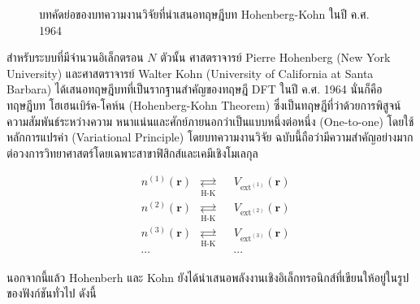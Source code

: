 \begin{figure}[H]
    \centering
    \caption{บทคัดย่อของบทความงานวิจัยที่นำเสนอทฤษฎีบท Hohenberg-Kohn ในปี ค.ศ. 1964}
    \label{fig:hohenberg_kohn_abs}
\end{figure}

สำหรับระบบที่มีจำนวนอิเล็กตรอน $N$ ตัวนั้น ศาสตราจารย์ Pierre Hohenberg (New York University) และศาสตราจารย์ Walter Kohn
(University of California at Santa Barbara) ได้เสนอทฤษฎีบทที่เป็นรากฐานสำคัญของทฤษฎี DFT ในปี ค.ศ. 1964 นั่นก็คือทฤษฎีบท%
โฮเฮนเบิร์ค-โคห์น (Hohenberg-Kohn Theorem)\autocite{hohenberg1964} ซึ่งเป็นทฤษฎีที่ว่าด้วยการพิสูจน์ความสัมพันธ์ระหว่างความ%
หนาแน่นและศักย์ภายนอกว่าเป็นแบบหนึ่งต่อหนึ่ง (One-to-one) โดยใช้หลักการแปรค่า (Variational Principle) โดยบทความงานวิจัย%
ฉบับนี้ถือว่ามีความสำคัญอย่างมากต่อวงการวิทยาศาสตร์โดยเฉพาะสาขาฟิสิกส์และเคมีเชิงโมเลกุล

\begin{framed}
    \centering
    \begin{align*}
         & n^{(1)}(\bm{r}) & \underset{\text{H-K}}{\rightleftarrows} &  & V_{\text{ext}^{(1)}}(\bm{r}) \\[0.5ex]
         & n^{(2)}(\bm{r}) & \underset{\text{H-K}}{\rightleftarrows} &  & V_{\text{ext}^{(2)}}(\bm{r}) \\[0.5ex]
         & n^{(3)}(\bm{r}) & \underset{\text{H-K}}{\rightleftarrows} &  & V_{\text{ext}^{(3)}}(\bm{r}) \\[0.5ex]
         & \cdots          &                                         &  & \cdots
    \end{align*}
\end{framed}

นอกจากนี้แล้ว Hohenberh และ Kohn ยังได้นำเสนอพลังงานเชิงอิเล็กทรอนิกส์ที่เขียนให้อยู่ในรูปของฟังก์ชันทั่วไป ดังนี้

